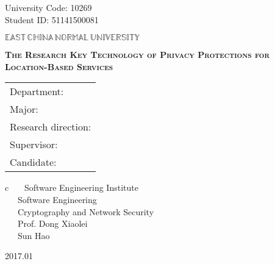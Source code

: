 \newpage

\pagestyle{empty}

\hskip 1.83cm {\large University Code: 10269}\\
\hspace*{\fill} {\large Student ID: 51141500081}

\vskip 2cm

\begin{center}
{\Huge $\mathbb{EAST}\,\mathbb{CHINA}\,\mathbb{NORMAL}\,
\mathbb{UNIVERSITY}$}
\end{center}

\vskip 3cm

\begin{center}
\bfseries{\scshape{\huge The Research Key Technology of Privacy Protections for Location-Based Services}}\\
\end{center}

\vskip 2cm {\large
\begin{center}
\begin{tabular}{l}
Department:\\
Major:\\
Research direction:\\
Supervisor:\\
Candidate:
\end{tabular}
\begin{tabular}c
~~~Software Engineering Institute       \\
\hline ~~~Software Engineering    \\
\hline ~~~Cryptography and Network Security\\
\hline ~~~Prof. Dong Xiaolei \\
\hline ~~~Sun Hao  \\
\hline
\end{tabular}
\end{center}}

\vskip 30mm

\begin{center}
{\Large 2017.01}
\end{center}
